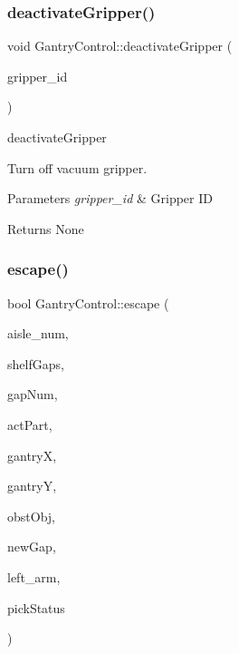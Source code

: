 \subsubsection{\texorpdfstring{deactivate\+Gripper()}{deactivateGripper()}}
{\footnotesize\ttfamily void Gantry\+Control\+::deactivate\+Gripper (\begin{DoxyParamCaption}\item[{std\+::string}]{gripper\+\_\+id }\end{DoxyParamCaption})}



deactivate\+Gripper 

Turn off vacuum gripper.


\begin{DoxyParams}{Parameters}
{\em gripper\+\_\+id} & Gripper ID \\
\hline
\end{DoxyParams}
\begin{DoxyReturn}{Returns}
None 
\end{DoxyReturn}
\mbox{\label{classGantryControl_aa014dd433af4fc580d38639c6353e7b8}} 
\subsubsection{\texorpdfstring{escape()}{escape()}}
{\footnotesize\ttfamily bool Gantry\+Control\+::escape (\begin{DoxyParamCaption}\item[{int \&}]{aisle\+\_\+num,  }\item[{std\+::vector$<$ std\+::pair$<$ float, float $>$ $>$ \&}]{shelf\+Gaps,  }\item[{const std\+::vector$<$ int $>$ \&}]{gap\+Num,  }\item[{bool}]{act\+Part,  }\item[{float \&}]{gantryX,  }\item[{float \&}]{gantryY,  }\item[{\hyperlink{classObstaclesInAisle}{Obstacles\+In\+Aisle} \&}]{obst\+Obj,  }\item[{int \&}]{new\+Gap,  }\item[{std\+::vector$<$ double $>$ \&}]{left\+\_\+arm,  }\item[{bool}]{pick\+Status }\end{DoxyParamCaption})}



